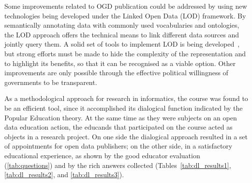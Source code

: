 


Some improvements related to OGD publication could be addressed by using new technologies being developed under the Linked Open Data (LOD) framework. By semantically annotating data with commonly used vocabularies and ontologies, the LOD approach offers the technical means to link different data sources and jointly query them. A solid set of tools to implement LOD is being developed~\cite{Auer2014}, but strong efforts must be made to hide the complexity of the representation and to highlight its benefits, so that it can be recognised as a viable option. Other improvements are only possible through the effective political willingness of governments to be transparent.

As a methodological approach for research in informatics, the course was found to be an efficient tool, since it accomplished its dialogical function indicated by the Popular Education theory. At the same time as they were subjects on an open data education action, the educands that participated on the course acted as objects in a research project. On one side the dialogical approach resulted in a set of appointments for open data publishers; on the other side, in a satisfactory educational experience, as shown by the good educator evaluation (\autoref{tab:questions}) and by the rich answers collected (Tables~\ref{tab:dl_results1}, \ref{tab:dl_results2}, and \ref{tab:dl_results3}).


